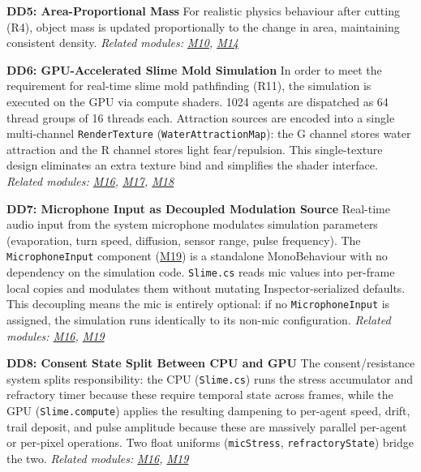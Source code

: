 \documentclass[12pt, titlepage]{article}
\begin{document}
\vspace{5mm}
\noindent
\textbf{DD5: Area-Proportional Mass}
\newline
For realistic physics behaviour after cutting (R4),
object mass is updated proportionally to the change in area, maintaining consistent density.
\newline
\textit{Related modules: \hyperref[M10]{M10}, \hyperref[M14]{M14}}

\vspace{5mm}
\noindent
\textbf{DD6: GPU-Accelerated Slime Mold Simulation}
\newline
In order to meet the requirement for real-time slime mold pathfinding (R11), the simulation is executed
on the GPU via compute shaders. 1024 agents are dispatched as 64 thread groups of 16 threads each.
Attraction sources are encoded into a single multi-channel \texttt{RenderTexture}
(\texttt{WaterAttractionMap}): the G channel stores water attraction and the R channel stores
light fear/repulsion. This single-texture design eliminates an extra texture bind and
simplifies the shader interface.
\newline
\textit{Related modules: \hyperref[M16]{M16}, \hyperref[M17]{M17}, \hyperref[M18]{M18}}

\vspace{5mm}
\noindent
\textbf{DD7: Microphone Input as Decoupled Modulation Source}
\newline
Real-time audio input from the system microphone modulates simulation parameters (evaporation,
turn speed, diffusion, sensor range, pulse frequency). The \texttt{MicrophoneInput} component
(\hyperref[M19]{M19}) is a standalone MonoBehaviour with no dependency on the simulation code.
\texttt{Slime.cs} reads mic values into per-frame local copies and modulates them without mutating
Inspector-serialized defaults. This decoupling means the mic is entirely optional: if no
\texttt{MicrophoneInput} is assigned, the simulation runs identically to its non-mic configuration.
\newline
\textit{Related modules: \hyperref[M16]{M16}, \hyperref[M19]{M19}}

\vspace{5mm}
\noindent
\textbf{DD8: Consent State Split Between CPU and GPU}
\newline
The consent/resistance system splits responsibility: the CPU (\texttt{Slime.cs}) runs the stress
accumulator and refractory timer because these require temporal state across frames, while the
GPU (\texttt{Slime.compute}) applies the resulting dampening to per-agent speed, drift, trail
deposit, and pulse amplitude because these are massively parallel per-agent or per-pixel
operations. Two float uniforms (\texttt{micStress}, \texttt{refractoryState}) bridge the two.
\newline
\textit{Related modules: \hyperref[M16]{M16}, \hyperref[M19]{M19}}
\end{document}
